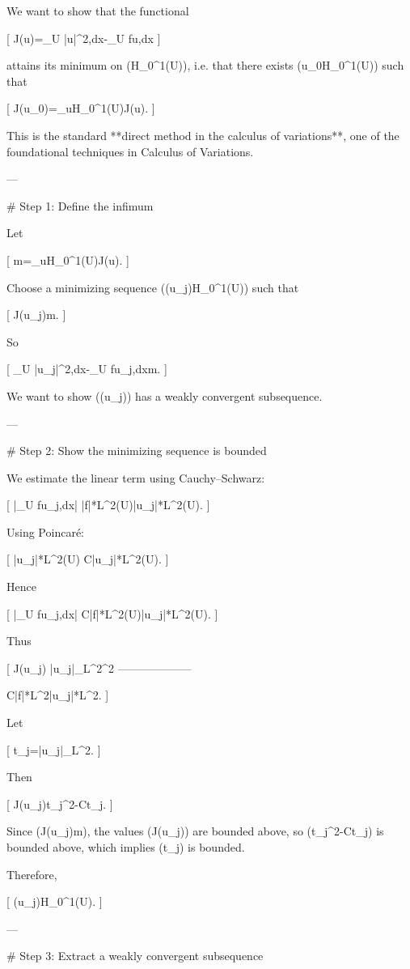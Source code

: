 We want to show that the functional

[
J(u)=\int_U |\nabla u|^2,dx-\int_U fu,dx
]

attains its minimum on (H_0^1(U)), i.e. that there exists (u_0\in H_0^1(U)) such that

[
J(u_0)=\inf_{u\in H_0^1(U)}J(u).
]

This is the standard **direct method in the calculus of variations**, one of the foundational techniques in Calculus of Variations.

---

# Step 1: Define the infimum

Let

[
m=\inf_{u\in H_0^1(U)}J(u).
]

Choose a minimizing sequence ((u_j)\subset H_0^1(U)) such that

[
J(u_j)\to m.
]

So

[
\int_U |\nabla u_j|^2,dx-\int_U fu_j,dx\to m.
]

We want to show ((u_j)) has a weakly convergent subsequence.

---

# Step 2: Show the minimizing sequence is bounded

We estimate the linear term using Cauchy–Schwarz:

[
\left|\int_U fu_j,dx\right|
\le
|f|*{L^2(U)}|u_j|*{L^2(U)}.
]

Using Poincaré:

[
|u_j|*{L^2(U)}
\le
C|\nabla u_j|*{L^2(U)}.
]

Hence

[
\left|\int_U fu_j,dx\right|
\le
C|f|*{L^2(U)}|\nabla u_j|*{L^2(U)}.
]

Thus

[
J(u_j)
\ge
|\nabla u_j|_{L^2}^2
--------------------

C|f|*{L^2}|\nabla u_j|*{L^2}.
]

Let

[
t_j=|\nabla u_j|_{L^2}.
]

Then

[
J(u_j)\ge t_j^2-Ct_j.
]

Since (J(u_j)\to m), the values (J(u_j)) are bounded above, so (t_j^2-Ct_j) is bounded above, which implies (t_j) is bounded.

Therefore,

[
(u_j)H_0^1(U).
]

---

# Step 3: Extract a weakly convergent subsequence

